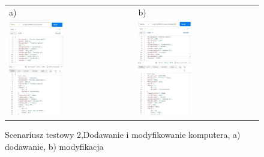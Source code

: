 \begin{figure}[htb]
  \centering
	\begin{tabular}{@{}ll@{}}
	a) & b) \\
  \includegraphics[width=0.45\textwidth]{rys06/postmanTest/addComp.pdf} & 
	\includegraphics[width=0.45\textwidth]{rys06/postmanTest/patch.pdf}
	\end{tabular}
  \caption{Scenariusz testowy 2,Dodawanie i modyfikowanie komputera, a) dodawanie, b) modyfikacja}
  \label{addModTest:label}
\end{figure}



